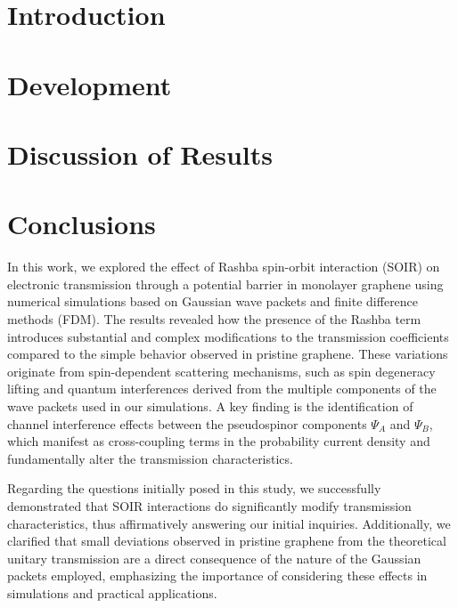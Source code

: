 \documentclass{../assets/templates/iopjournal}
\begin{document}



    \section{Introduction}\label{sec:introduction}
    


    \section{Development}\label{sec:development}
    


    \section{Discussion of Results}\label{sec:discussion-of-results}
    


    \section{Conclusions}\label{sec:conclusions}

    In this work, we explored the effect of Rashba spin-orbit interaction (SOIR) on electronic transmission through a potential barrier in monolayer graphene using numerical simulations based on Gaussian wave packets and finite difference methods (FDM). The results revealed how the presence of the Rashba term introduces substantial and complex modifications to the transmission coefficients compared to the simple behavior observed in pristine graphene.
    These variations originate from spin-dependent scattering mechanisms, such as spin degeneracy lifting and quantum interferences derived from the multiple components of the wave packets used in our simulations.
    A key finding is the identification of channel interference effects between the pseudospinor components $\Psi_A$ and $\Psi_B$, which manifest as cross-coupling terms in the probability current density and fundamentally alter the transmission characteristics.

    Regarding the questions initially posed in this study, we successfully demonstrated that SOIR interactions do significantly modify transmission characteristics, thus affirmatively answering our initial inquiries.
    Additionally, we clarified that small deviations observed in pristine graphene from the theoretical unitary transmission are a direct consequence of the nature of the Gaussian packets employed, emphasizing the importance of considering these effects in simulations and practical applications.
\end{document}
